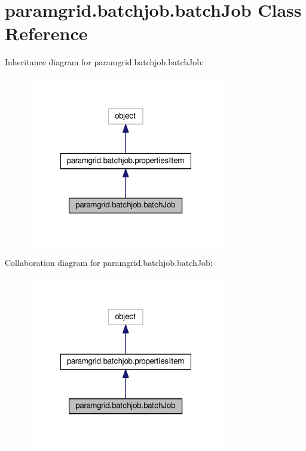 \hypertarget{classparamgrid_1_1batchjob_1_1batchJob}{}\section{paramgrid.\+batchjob.\+batch\+Job Class Reference}
\label{classparamgrid_1_1batchjob_1_1batchJob}


Inheritance diagram for paramgrid.\+batchjob.\+batch\+Job\+:
\nopagebreak
\begin{figure}[H]
\begin{center}
\leavevmode
\includegraphics[width=244pt]{classparamgrid_1_1batchjob_1_1batchJob__inherit__graph}
\end{center}
\end{figure}


Collaboration diagram for paramgrid.\+batchjob.\+batch\+Job\+:
\nopagebreak
\begin{figure}[H]
\begin{center}
\leavevmode
\includegraphics[width=244pt]{classparamgrid_1_1batchjob_1_1batchJob__coll__graph}
\end{center}
\end{figure}
